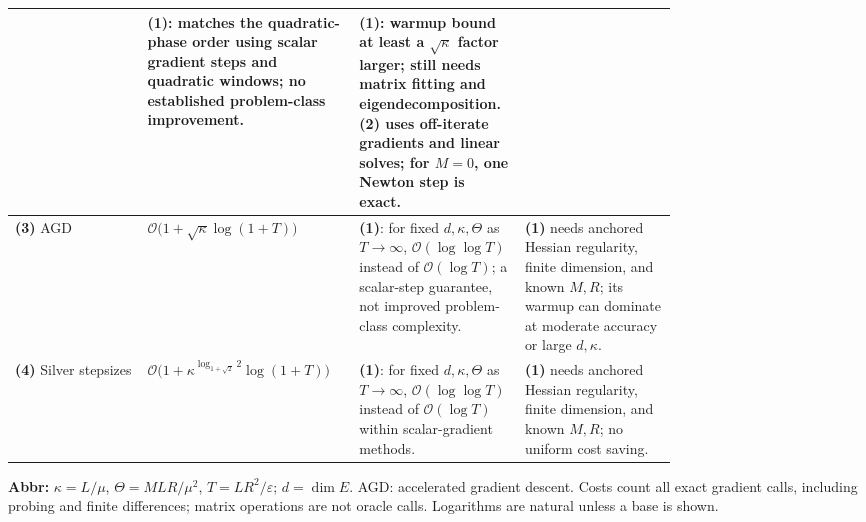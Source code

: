 \begin{table}[tp]
\begin{threeparttable}
\begin{tabularx}{\linewidth}{@{}>{\raggedright\arraybackslash}p{0.20\linewidth}>{\raggedright\arraybackslash}p{0.32\linewidth}>{\raggedright\arraybackslash}p{0.25\linewidth}>{\raggedright\arraybackslash}X@{}}
& \textbf{(1)}: matches the quadratic-phase order using scalar gradient steps and quadratic windows; no established problem-class improvement.
& \textbf{(1)}: warmup bound at least a $\sqrt\kappa$ factor larger; still needs matrix fitting and eigendecomposition. \textbf{(2)} uses off-iterate gradients and linear solves; for $M=0$, one Newton step is exact. \\
\midrule
\textbf{(3)} AGD \citep[Thm.~3.18]{mrhBubeck2015v2}
& $\mathcal{O}\!\bigl(1+\sqrt\kappa\log(1+T)\bigr)$
& \textbf{(1)}: for fixed $d,\kappa,\Theta$ as $T\to\infty$, $\mathcal{O}(\log\log T)$ instead of $\mathcal{O}(\log T)$; a scalar-step guarantee, not improved problem-class complexity.
& \textbf{(1)} needs anchored Hessian regularity, finite dimension, and known $M,R$; its warmup can dominate at moderate accuracy or large $d,\kappa$. \\
\midrule
\textbf{(4)} Silver stepsizes \citep[Thm.~1.1]{mrhAltschulerParrilo2023v1}
& $\mathcal{O}\!\bigl(1+\kappa^{\log_{1+\sqrt2}2}\log(1+T)\bigr)$
& \textbf{(1)}: for fixed $d,\kappa,\Theta$ as $T\to\infty$, $\mathcal{O}(\log\log T)$ instead of $\mathcal{O}(\log T)$ within scalar-gradient methods.
& \textbf{(1)} needs anchored Hessian regularity, finite dimension, and known $M,R$; no uniform cost saving. \\
\bottomrule
\end{tabularx}
\begin{tablenotes}[flushleft]\footnotesize
\item[] \textbf{Abbr:} $\kappa=L/\mu$, $\Theta=MLR/\mu^2$, $T=LR^2/\varepsilon$; $d=\dim E$. AGD: accelerated gradient descent. Costs count all exact gradient calls, including probing and finite differences; matrix operations are not oracle calls. Logarithms are natural unless a base is shown.
\end{tablenotes}
\end{threeparttable}
\end{table}
\clearpage
